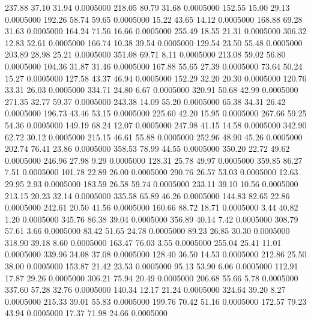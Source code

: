  237.88   37.10   31.94   0.0005000
 218.05   80.79   31.68   0.0005000
 152.55   15.00   29.13   0.0005000
 192.26   58.74   59.65   0.0005000
  15.22   43.65   14.12   0.0005000
 168.88   69.28   31.63   0.0005000
 164.24   71.56   16.66   0.0005000
 255.49   18.55   21.31   0.0005000
 306.32   12.83   52.61   0.0005000
 166.74   10.38   39.54   0.0005000
 129.54   23.50   55.48   0.0005000
 203.89   28.98   25.21   0.0005000
 351.08   69.71    8.11   0.0005000
 213.08   59.02   56.80   0.0005000
 104.36   31.87   31.46   0.0005000
 167.88   55.65   27.39   0.0005000
  73.64   50.24   15.27   0.0005000
 127.58   43.37   46.94   0.0005000
 152.29   32.20   20.30   0.0005000
 120.76   33.31   26.03   0.0005000
 334.71   24.80    6.67   0.0005000
 320.91   50.68   42.99   0.0005000
 271.35   32.77   59.37   0.0005000
 243.38   14.09   55.20   0.0005000
  65.38   34.31   26.42   0.0005000
 196.73   43.46   53.15   0.0005000
 225.60   42.20   15.95   0.0005000
 267.66   59.25   54.36   0.0005000
 149.19   68.24   12.07   0.0005000
 247.98   41.15   14.58   0.0005000
 342.90   62.72   30.12   0.0005000
 215.15   46.61   55.88   0.0005000
 252.96   48.90   45.26   0.0005000
 202.74   76.41   23.86   0.0005000
 358.53   78.99   44.55   0.0005000
 350.20   22.72   49.62   0.0005000
 246.96   27.98    9.29   0.0005000
 128.31   25.78   49.97   0.0005000
 359.85   86.27    7.51   0.0005000
 101.78   22.89   26.00   0.0005000
 290.76   26.57   53.03   0.0005000
  12.63   29.95    2.93   0.0005000
 183.59   26.58   59.74   0.0005000
 233.11   39.10   10.56   0.0005000
 213.15   20.23   32.14   0.0005000
 335.58   65.89   46.26   0.0005000
 144.83   82.65   22.86   0.0005000
 242.61   20.50   41.56   0.0005000
 160.66   88.72   18.71   0.0005000
   3.44   40.82    1.20   0.0005000
 345.76   86.38   39.04   0.0005000
 356.89   40.14    7.42   0.0005000
 308.79   57.61    3.66   0.0005000
  83.42   51.65   24.78   0.0005000
  89.23   26.85   30.30   0.0005000
 318.90   39.18    8.60   0.0005000
 163.47   76.03    3.55   0.0005000
 255.04   25.41   11.01   0.0005000
 339.96   34.08   37.08   0.0005000
 128.40   36.50   14.53   0.0005000
 212.86   25.50   38.00   0.0005000
 153.87   21.42   23.53   0.0005000
  95.13   53.90    6.06   0.0005000
 112.91   17.87   29.26   0.0005000
 306.21   75.94   20.49   0.0005000
 206.68   55.66    5.78   0.0005000
 337.60   57.28   32.76   0.0005000
 140.34   12.17   21.24   0.0005000
 324.64   39.20    8.27   0.0005000
 215.33   39.01   55.83   0.0005000
 199.76   70.42   51.16   0.0005000
 172.57   79.23   43.94   0.0005000
  17.37   71.98   24.66   0.0005000
